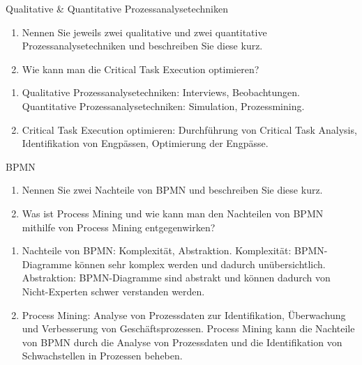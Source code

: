 \documentclass{article}
\begin{document}
\begin{exercise}{Qualitative \& Quantitative Prozessanalysetechniken}
  \begin{enumerate}
    \item Nennen Sie jeweils zwei qualitative und zwei quantitative Prozessanalysetechniken und beschreiben Sie diese kurz.
    \item Wie kann man die Critical Task Execution optimieren?
  \end{enumerate}

  \begin{solution}
    \begin{enumerate}
      \item Qualitative Prozessanalysetechniken: Interviews, Beobachtungen. Quantitative Prozessanalysetechniken: Simulation, Prozessmining.
      \item Critical Task Execution optimieren: Durchführung von Critical Task Analysis, Identifikation von Engpässen, Optimierung der Engpässe.
    \end{enumerate}
  \end{solution}
\end{exercise}

\begin{exercise}{BPMN}
  \begin{enumerate}
    \item Nennen Sie zwei Nachteile von BPMN und beschreiben Sie diese kurz.
    \item Was ist Process Mining und wie kann man den Nachteilen von BPMN mithilfe von Process Mining entgegenwirken?
  \end{enumerate}

  \begin{solution}
    \begin{enumerate}
      \item Nachteile von BPMN: Komplexität, Abstraktion. Komplexität: BPMN-Diagramme können sehr komplex werden und dadurch unübersichtlich. Abstraktion: BPMN-Diagramme sind abstrakt und können dadurch von Nicht-Experten schwer verstanden werden.
      \item Process Mining: Analyse von Prozessdaten zur Identifikation, Überwachung und Verbesserung von Geschäftsprozessen. Process Mining kann die Nachteile von BPMN durch die Analyse von Prozessdaten und die Identifikation von Schwachstellen in Prozessen beheben.
    \end{enumerate}
  \end{solution}
\end{exercise}
\end{document}

